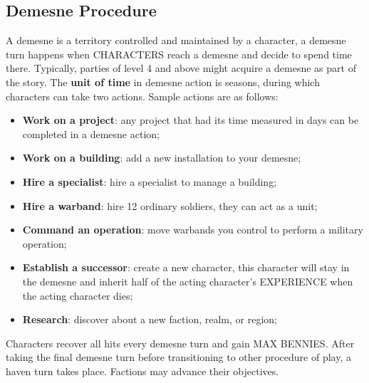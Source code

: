\subsection{Demesne Procedure}
A demesne is a territory controlled and maintained by a character, a demesne turn happens when CHARACTERS reach a demesne and decide to spend time there. Typically, parties of level 4 and above might acquire a demesne as part of the story. The \textbf{unit of time} in demesne action is seasons, during which characters can take two actions. Sample actions are as follows:
\begin{itemize}
    \item {\textbf{Work on a project}: any project that had its time measured in days can be completed in a demesne action;}
    \item {\textbf{Work on a building}: add a new installation to your demesne;}
    \item {\textbf{Hire a specialist}: hire a specialist to manage a building;}
    \item {\textbf{Hire a warband}: hire 12 ordinary soldiers, they can act as a unit;}
    \item {\textbf{Command an operation}: move warbands you control to perform a military operation;}
    \item {\textbf{Establish a successor}: create a new character, this character will stay in the demesne and inherit half of the acting character's EXPERIENCE when the acting character dies;}
    \item {\textbf{Research}: discover about a new faction, realm, or region;}
\end{itemize}
Characters recover all hits every demesne turn and gain MAX BENNIES. After taking the final demesne turn before transitioning to other procedure of play, a haven turn takes place. Factions may advance their objectives.

